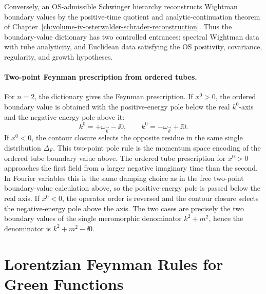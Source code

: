 Conversely, an OS-admissible Schwinger hierarchy reconstructs Wightman
boundary values by the positive-time quotient and analytic-continuation
theorem of Chapter~\ref{ch:volume-iv-osterwalder-schrader-reconstruction}.
Thus the boundary-value dictionary has two controlled entrances: spectral
Wightman data with tube analyticity, and Euclidean data satisfying the OS
positivity, covariance, regularity, and growth hypotheses.

\paragraph{Two-point Feynman prescription from ordered tubes.}
For \(n=2\), the dictionary gives the Feynman prescription.  If
\(x^0>0\), the ordered boundary value is obtained with the positive-energy
pole below the real \(k^0\)-axis and the negative-energy pole above it:
\[
  k^0=+\omega_{\vec k}-\ii0,
  \qquad
  k^0=-\omega_{\vec k}+\ii0.
\]
If \(x^0<0\), the contour closure selects the opposite residue in the same
single distribution \(\Delta_F\).  This two-point pole rule is the momentum
space encoding of the ordered tube boundary value above.
The ordered tube prescription for \(x^0>0\) approaches the first field from a
larger negative imaginary time than the second.  In Fourier variables this is
the same damping choice as in the free two-point boundary-value calculation
above, so the positive-energy pole is passed below the real axis.  If
\(x^0<0\), the operator order is reversed and the contour closure selects the
negative-energy pole above the axis.  The two cases are precisely the two
boundary values of the single
meromorphic denominator \(k^2+m^2\), hence the denominator is
\(k^2+m^2-\ii0\).

\section{Lorentzian Feynman Rules for Green Functions}

